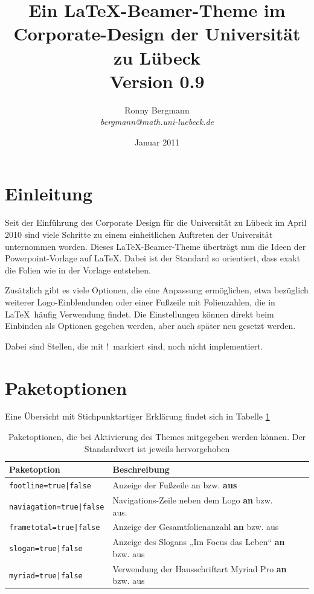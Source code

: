 \documentclass[a4paper,DIV=calc, oneside]{scrartcl}
\newcommand{\missing}{{\color{red}!}}
\begin{document}
	\thispagestyle{empty}
\title{\vspace{-3\baselineskip}Ein \textnormal{\LaTeX}-Beamer-Theme im Corporate-Design der Universität zu Lübeck\\{\large\normalfont Version 0.9}}
\author{Ronny Bergmann\\\emph{bergmann@math.uni-luebeck.de}}
\date{Januar 2011}
\maketitle
\section{Einleitung}
Seit der Einführung des Corporate Design für die Universität zu Lübeck im April 2010 sind viele Schritte zu einem einheitlichen Auftreten der Universität unternommen worden. Dieses \LaTeX-Beamer-Theme überträgt nun die Ideen der
Powerpoint-Vorlage auf \LaTeX. Dabei ist der Standard so orientiert, dass exakt die Folien wie in der Vorlage entstehen.

Zusätzlich gibt es viele Optionen, die eine Anpassung ermöglichen, etwa bezüglich weiterer Logo-Einblendunden oder
einer Fußzeile mit Folienzahlen, die in \LaTeX\ häufig Verwendung findet. Die Einstellungen können direkt beim Einbinden als Optionen gegeben werden, aber auch später neu gesetzt werden.

Dabei sind Stellen, die mit \missing\  markiert sind, noch nicht implementiert.

\section{Paketoptionen}
Eine Übersicht mit Stichpunktartiger Erklärung findet sich in Tabelle \ref{tab:Paketoptionen}
\begin{table}[hbt]
	\begin{tabular}{llll}
		\toprule
		\textbf{Paketoption} & \textbf{Beschreibung}\\\midrule
		\lstinline!footline=true|false! & Anzeige der Fußzeile an bzw. \textbf{aus}\\
		\lstinline!naviagation=true|false! & Navigations-Zeile neben dem Logo \textbf{an} bzw. aus.\\
		\lstinline!frametotal=true|false! & Anzeige der Gesamtfolienanzahl \textbf{an} bzw. aus\\
		\lstinline!slogan=true|false! & Anzeige des Slogans „Im Focus das Leben“ \textbf{an} bzw. aus\\
		\lstinline!myriad=true|false! & Verwendung der Hausschriftart Myriad Pro \textbf{an} bzw. aus\\\bottomrule
	\end{tabular}
	\caption{Paketoptionen, die bei Aktivierung des Themes mitgegeben werden können. Der Standardwert ist jeweils hervorgehoben}
	\label{tab:Paketoptionen}
\end{table}
\end{document}
